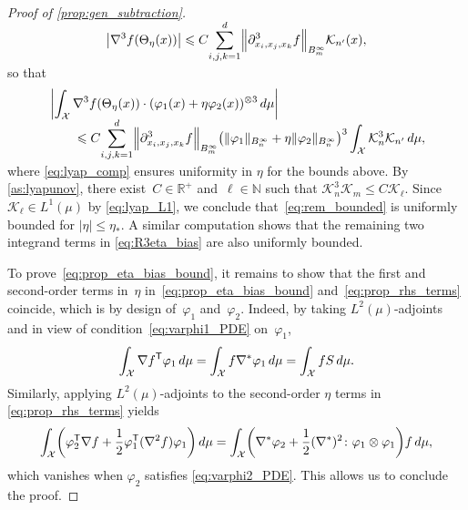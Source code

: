 \documentclass[11pt]{article}
\newcommand{\R}{\mathbb{R}}
\newcommand{\N}{\mathbb{N}}
\renewcommand{\leq}{\leqslant}
\renewcommand{\t}{\mathsf T}
\DeclarePairedDelimiter\abs{\lvert}{\rvert}
\DeclarePairedDelimiter\norm{\lVert}{\rVert}
\DeclarePairedDelimiter\paren{\lparen}{\rparen}
\theoremstyle{definition}
\begin{document}
\begin{proof}[Proof of \cref{prop:gen_subtraction}]
\begin{align}
\notag
	\abs*{\nabla^3f\paren*{\Theta_\eta(x)}} \leq C\smash{\sum_{i,j,k=1}^d}\norm*{\partial_{x_i,x_j,x_k}^3 f}_{B_m^\infty}\mathcal{K}_{n'}(x),
\end{align}
so that 
\begin{align}
\notag
	&\left|\int_\mathcal{X} \nabla^3f\paren*{\Theta_\eta(x)}\cdot (\varphi_1(x) + \eta\varphi_2(x))^{\otimes 3} \, d\mu\right| \\%
	\label{eq:rem_bounded}
&\qquad \leq C\smash{\sum_{i,j,k=1}^d}\norm*{\partial_{x_i,x_j,x_k}^3 f}_{B_m^\infty}\paren*{\norm{\varphi_1}_{B_n^\infty} + \eta\norm{\varphi_2}_{B_n^\infty}}^3\int_\mathcal{X} \mathcal{K}_n^3\mathcal{K}_{n'} \, d\mu,
\end{align}
where \eqref{eq:lyap_comp} ensures uniformity in $\eta$ for the bounds above. By \cref{as:lyapunov}, there exist~$C\in \R^+$ and~$\ell\in\N$ such that $\mathcal{K}_n^3\mathcal{K}_m \leq C\mathcal{K}_\ell$. Since $\mathcal{K}_\ell \in L^1(\mu)$ by \eqref{eq:lyap_L1}, we conclude that~\eqref{eq:rem_bounded} is uniformly bounded for $|\eta|\leq \eta_*$. A similar computation shows that the remaining two integrand terms in \eqref{eq:R3eta_bias} are also uniformly bounded. 

To prove~\eqref{eq:prop_eta_bias_bound}, it remains to show that the first and second-order terms in~$\eta$ in~\eqref{eq:prop_eta_bias_bound} and~\eqref{eq:prop_rhs_terms} coincide, which is by design of~$\varphi_1$ and~$\varphi_2$. Indeed, by taking $L^2(\mu)$-adjoints and in view of condition~\eqref{eq:varphi1_PDE} on~$\varphi_1$,
\begin{equation}
\notag
	\int_\mathcal{X} \nabla f^\t \varphi_1 \, d\mu = \int_\mathcal{X} f\nabla^* \varphi_1 \, d\mu = \int_\mathcal{X} f S \, d\mu.
\end{equation}
Similarly, applying $L^2(\mu)$-adjoints to the second-order $\eta$ terms in \eqref{eq:prop_rhs_terms} yields
\begin{align}
\notag
	\int_\mathcal{X} \paren*{\varphi_2^\t \nabla f + \frac{1}{2}\varphi_1^\t (\nabla^2f) \varphi_1} \, d\mu = \int_\mathcal{X} \paren*{\nabla^*\varphi_2 + \frac{1}{2}(\nabla^*)^2 \colon \varphi_1\otimes \varphi_1}f \, d\mu,
\end{align}
which vanishes when $\varphi_2$ satisfies \eqref{eq:varphi2_PDE}. This allows us to conclude the proof.
\end{proof}
\end{document}

